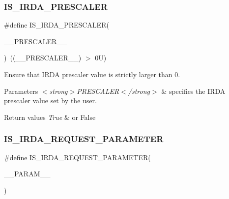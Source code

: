 \subsubsection{\texorpdfstring{I\+S\+\_\+\+I\+R\+D\+A\+\_\+\+P\+R\+E\+S\+C\+A\+L\+ER}{IS\_IRDA\_PRESCALER}}
{\footnotesize\ttfamily \#define I\+S\+\_\+\+I\+R\+D\+A\+\_\+\+P\+R\+E\+S\+C\+A\+L\+ER(\begin{DoxyParamCaption}\item[{}]{\+\_\+\+\_\+\+P\+R\+E\+S\+C\+A\+L\+E\+R\+\_\+\+\_\+ }\end{DoxyParamCaption})~((\+\_\+\+\_\+\+P\+R\+E\+S\+C\+A\+L\+E\+R\+\_\+\+\_\+) $>$ 0\+U)}



Ensure that I\+R\+DA prescaler value is strictly larger than 0. 


\begin{DoxyParams}{Parameters}
{\em $<$strong$>$\+P\+R\+E\+S\+C\+A\+L\+E\+R$<$/strong$>$} & specifies the I\+R\+DA prescaler value set by the user. \\
\hline
\end{DoxyParams}

\begin{DoxyRetVals}{Return values}
{\em True} & or False \\
\hline
\end{DoxyRetVals}
\mbox{\label{group___i_r_d_a___private___macros_gad9d643360bbb8c35f04c9aeefa5bb1d5}} 
\subsubsection{\texorpdfstring{I\+S\+\_\+\+I\+R\+D\+A\+\_\+\+R\+E\+Q\+U\+E\+S\+T\+\_\+\+P\+A\+R\+A\+M\+E\+T\+ER}{IS\_IRDA\_REQUEST\_PARAMETER}}
{\footnotesize\ttfamily \#define I\+S\+\_\+\+I\+R\+D\+A\+\_\+\+R\+E\+Q\+U\+E\+S\+T\+\_\+\+P\+A\+R\+A\+M\+E\+T\+ER(\begin{DoxyParamCaption}\item[{}]{\+\_\+\+\_\+\+P\+A\+R\+A\+M\+\_\+\+\_\+ }\end{DoxyParamCaption})}

